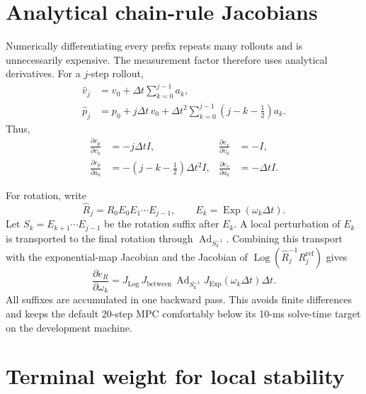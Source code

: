 \documentclass[11pt]{article}
\newcommand{\Exp}{\operatorname{Exp}}
\newcommand{\Log}{\operatorname{Log}}
\begin{document}
\section{Analytical chain-rule Jacobians}

Numerically differentiating every prefix repeats many rollouts and is unnecessarily expensive.
The measurement factor therefore uses analytical derivatives.  For a $j$-step rollout,
\begin{align}
\widehat v_j &= v_0+\Delta t\sum_{k=0}^{j-1}a_k,\\
\widehat p_j &= p_0+j\Delta t\,v_0
 +\Delta t^2\sum_{k=0}^{j-1}\left(j-k-\frac{1}{2}\right)a_k.
\end{align}
Thus,
\begin{align}
\frac{\partial e_p}{\partial v_0}&=-j\Delta t I,&
\frac{\partial e_v}{\partial v_0}&=-I,\\
\frac{\partial e_p}{\partial a_k}&=-\left(j-k-\frac{1}{2}\right)\Delta t^2I,&
\frac{\partial e_v}{\partial a_k}&=-\Delta t I.
\end{align}

For rotation, write
\begin{equation}
\widehat R_j=R_0E_0E_1\cdots E_{j-1},
\qquad E_k=\Exp(\omega_k\Delta t).
\end{equation}
Let $S_k=E_{k+1}\cdots E_{j-1}$ be the rotation suffix after $E_k$.  A local perturbation of
$E_k$ is transported to the final rotation through $\operatorname{Ad}_{S_k^{-1}}$.  Combining
this transport with the exponential-map Jacobian and the Jacobian of
$\Log(\widehat R_j^{-1}R_j^{\mathrm{ref}})$ gives
\begin{equation}
\frac{\partial e_R}{\partial\omega_k}
=J_{\Log}\,J_{\mathrm{between}}\,
\operatorname{Ad}_{S_k^{-1}}J_{\Exp}(\omega_k\Delta t)\Delta t.
\end{equation}
All suffixes are accumulated in one backward pass.  This avoids finite differences and keeps the
default 20-step MPC comfortably below its 10-ms solve-time target on the development machine.

\section{Terminal weight for local stability}
\end{document}
